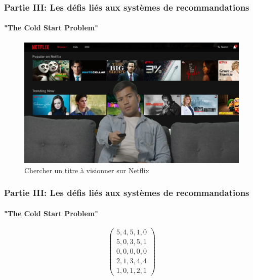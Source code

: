 \begin{frame}

    \frametitle{Partie III: Les défis liés aux systèmes de recommandations}
    \framesubtitle{"The Cold Start Problem"}

    \begin{figure}
        \centering
        \includegraphics[totalheight=5.5cm]{Images/PartieIII/GuyBrowsingNetflix.png}
        \caption{Chercher un titre à visionner sur Netflix}
    \end{figure}

\end{frame}

\begin{frame}

    \frametitle{Partie III: Les défis liés aux systèmes de recommandations}
    \framesubtitle{"The Cold Start Problem"}

    \begin{figure}
        \[
            \begin{pmatrix}
                5, 4, 5, 1, 0 \\
                5, 0, 3, 5, 1 \\
                0, 0, 0, 0, 0 \\
                2, 1, 3, 4, 4 \\
                1, 0, 1, 2, 1
            \end{pmatrix}
        \]

    \end{figure}

\end{frame}

